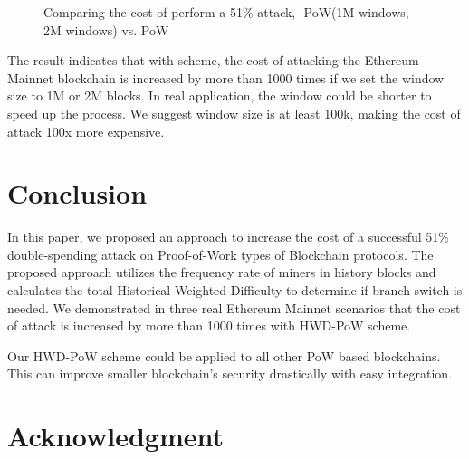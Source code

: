 \documentclass[conference]{IEEEtran}
\begin{document}
\begin{figure}[htbp]
\caption{Comparing the cost of perform a 51\% attack, -PoW(1M windows, 2M windows) vs. PoW}
\label{fig3}
\end{figure}    

The result indicates that with  scheme, the cost of attacking the Ethereum Mainnet blockchain is increased by more than 1000 times if we set the window size to 1M or 2M blocks. In real application, the window could be shorter to speed up the process. We suggest window size is at least 100k, making the cost of attack 100x more expensive.


\section{Conclusion}
 
In this paper, we proposed an approach to increase the cost of a successful 51\% double-spending attack on Proof-of-Work types of Blockchain protocols. The proposed approach utilizes the frequency rate of miners in history blocks and calculates the total Historical Weighted Difficulty to determine if branch switch is needed. We demonstrated in three real Ethereum Mainnet scenarios that the cost of attack is increased by more than 1000 times with HWD-PoW scheme.

Our HWD-PoW scheme could be applied to all other PoW based blockchains. This can improve smaller blockchain's security drastically with easy integration. 

\section*{Acknowledgment}
\end{document}

